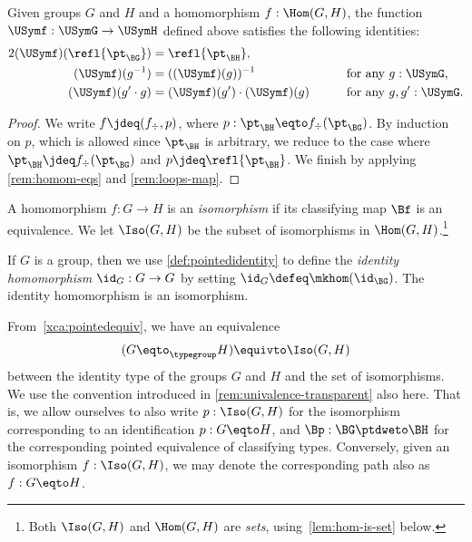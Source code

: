 \begin{lemma}\label{lem:grouphomomaxioms}
  Given groups $G$ and $H$ and a homomorphism $f : \Hom(G,H)$, the function $\USymf : \USymG \to \USymH$ defined above satisfies
  the following identities:
  \begin{alignat}2
    \label{gp-homo-unit} (\USymf) ( \refl {\pt_{\BG}} )
    &= \refl{\pt_{\BH}},   &\qquad&                                        \\
    \label{gp-homo-inv} (\USymf) (g^{-1})
    &= ((\USymf) (g))^{-1}                   && \text{for any $g : \USymG$,} \\
    \label{gp-homo-comp} (\USymf) (g' \cdot g)
    &=  (\USymf) (g') \cdot  (\USymf) (g) && \text{for any $g, g' : \USymG$.}
  \end{alignat}
\end{lemma}

\begin{proof}
  We write $f \jdeq (f_\div,p)$, where $p : \pt_{\BH} \eqto f_\div (\pt_{\BG})$.
  By induction on $p$, which is allowed since $\pt_{\BH}$ is arbitrary,
  we reduce to the case where $\pt_{\BH} \jdeq f_\div (\pt_{\BG})$
  and $p\jdeq \refl{\pt_{\BH}}$.
  We finish by applying \cref{rem:homom-eqs} and \ref{rem:loops-map}.
\end{proof}

\begin{definition}\label{def:groupisomorphism}
  A homomorphism $f : G\to H$ is an \emph{isomorphism} if its classifying map $\Bf$ is an equivalence.
  We let $\Iso(G,H)$ be the subset of isomorphisms in $\Hom(G, H)$.\footnote{%
    Both $\Iso(G,H)$ and $\Hom(G,H)$ are \emph{sets},
    using~\cref{lem:hom-is-set} below.}
\end{definition}

\begin{definition}\label{def:identity-group-homomorphism}
  If $G$ is a group, then we use \cref{def:pointedidentity} to define the \emph{identity homomorphism} $\id_G : G\to G$ by
  setting $\id_G \defeq \mkhom (\id_\BG)$.  The
  identity homomorphism is an isomorphism.
\end{definition}

\begin{remark}
  \label{remark:groupsasunivalenttype} From~\cref{xca:pointedequiv},
  we have an equivalence
  \[
    (G\eqto_\typegroup H)\equivto \Iso(G,H)
  \]
  between the identity type of the groups $G$ and $H$ and the 
  set of isomorphisms. We use the convention introduced in
  \cref{rem:univalence-transparent} also here. That is,
  we allow ourselves to also write $p : \Iso(G,H)$ for the isomorphism
  corresponding to an identification $p:G\eqto H$,
  and $\Bp : \BG \ptdweto \BH$ for the corresponding pointed equivalence
  of classifying types. Conversely, given an isomorphism
  $f : \Iso(G,H)$, we may denote the corresponding path
  also as $f:G\eqto H$.
\end{remark}


